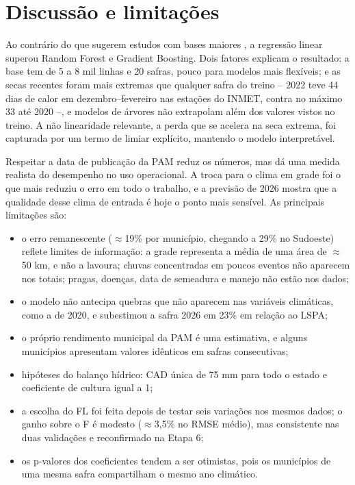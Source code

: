 \documentclass[12pt]{article}
\begin{document}
\section{Discussão e limitações}

Ao contrário do que sugerem estudos com bases maiores
\cite{jeong2016,vonbloh2023}, a regressão linear superou Random Forest e
Gradient Boosting. Dois fatores explicam o resultado: a base tem de 5 a 8
mil linhas e 20 safras, pouco para modelos mais flexíveis; e as secas
recentes foram mais extremas que qualquer safra do treino -- 2022 teve 44
dias de calor em dezembro--fevereiro nas estações do INMET, contra no
máximo 33 até 2020 --, e modelos de árvores não extrapolam além dos
valores vistos no treino. A não linearidade relevante, a perda que se
acelera na seca extrema, foi capturada por um termo de limiar explícito,
mantendo o modelo interpretável.

Respeitar a data de publicação da PAM reduz os números, mas dá uma medida
realista do desempenho no uso operacional. A troca para o clima em grade
foi o que mais reduziu o erro em todo o trabalho, e a previsão de 2026
mostra que a qualidade desse clima de entrada é hoje o ponto mais
sensível. As principais limitações são:

\begin{itemize}
  \item o erro remanescente ($\approx$19\% por município, chegando a 29\%
    no Sudoeste) reflete limites de informação: a grade representa a
    média de uma área de $\approx$50 km, e não a lavoura; chuvas
    concentradas em poucos eventos não aparecem nos totais; pragas,
    doenças, data de semeadura e manejo não estão nos dados;
  \item o modelo não antecipa quebras que não aparecem nas variáveis
    climáticas, como a de 2020, e subestimou a safra 2026 em 23\% em
    relação ao LSPA;
  \item o próprio rendimento municipal da PAM é uma estimativa, e alguns
    municípios apresentam valores idênticos em safras consecutivas;
  \item hipóteses do balanço hídrico: CAD única de 75 mm para todo o
    estado e coeficiente de cultura igual a 1;
  \item a escolha do FL foi feita depois de testar seis variações nos
    mesmos dados; o ganho sobre o F é modesto ($\approx$3,5\% no RMSE
    médio), mas consistente nas duas validações e reconfirmado na Etapa 6;
  \item os p-valores dos coeficientes tendem a ser otimistas, pois os
    municípios de uma mesma safra compartilham o mesmo ano climático.
\end{itemize}
\end{document}
